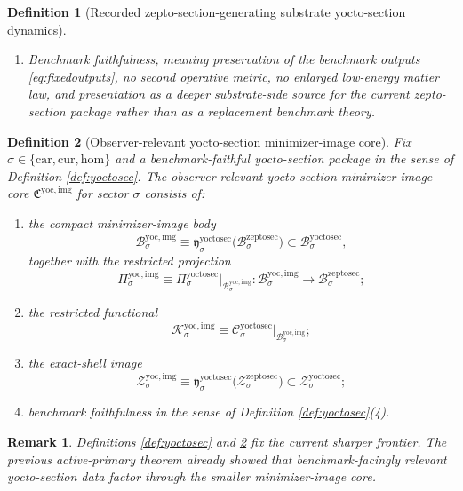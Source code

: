 \documentclass[11pt]{article}
\newcommand{\Car}{\mathrm{car}}
\newcommand{\Cur}{\mathrm{cur}}
\newcommand{\Hom}{\mathrm{hom}}
\newcommand{\ZeptoSectionBody}[1]{\mathcal B_{#1}^{\mathrm{zeptosec}}}
\newcommand{\ZeptoSectionShell}[1]{\mathcal Z_{#1}^{\mathrm{zeptosec}}}
\newcommand{\YoctoSectionBody}[1]{\mathcal B_{#1}^{\mathrm{yoctosec}}}
\newcommand{\YoctoSectionProj}[1]{\Pi_{#1}^{\mathrm{yoctosec}}}
\newcommand{\YoctoSectionFiber}[2]{\mathcal F_{#1}^{\mathrm{yoctosec}}(#2)}
\newcommand{\YoctoSectionZeptoMin}[1]{\mathfrak y_{#1}^{\mathrm{yoctosec}}}
\newcommand{\YoctoSectionFunctional}[1]{\mathscr C_{#1}^{\mathrm{yoctosec}}}
\newcommand{\YoctoSectionShell}[1]{\mathcal Z_{#1}^{\mathrm{yoctosec}}}
\newcommand{\YoctoImageCore}{\mathfrak C^{\mathrm{yoc,img}}}
\newcommand{\YoctoImgBody}[1]{\mathcal B_{#1}^{\mathrm{yoc,img}}}
\newcommand{\YoctoImgProj}[1]{\Pi_{#1}^{\mathrm{yoc,img}}}
\newcommand{\YoctoImgFunctional}[1]{\mathscr K_{#1}^{\mathrm{yoc,img}}}
\newcommand{\YoctoImgShell}[1]{\mathcal Z_{#1}^{\mathrm{yoc,img}}}
\newtheorem{definition}{Definition}
\newtheorem{remark}{Remark}
\begin{document}
\begin{definition}[Recorded zepto-section-generating substrate yocto-section dynamics]
\begin{enumerate}
\[\begin{array}{l}
    \YoctoSectionFunctional{\sigma}(y)
    =
    \displaystyle\min_{x\in\YoctoSectionFiber{\sigma}{\YoctoSectionProj{\sigma}(y)}}
    \YoctoSectionFunctional{\sigma}(x)
    \end{array}
    \right\},
    \]
    and
    \[
    \YoctoSectionProj{\sigma}\big|_{\YoctoSectionShell{\sigma}}
    :
    \YoctoSectionShell{\sigma}
    \xrightarrow{\cong}
    \ZeptoSectionShell{\sigma}
    \]
    is a diffeomorphism.
    \item Benchmark faithfulness, meaning preservation of the benchmark outputs \eqref{eq:fixedoutputs}, no second operative metric, no enlarged low-energy matter law, and presentation as a deeper substrate-side source for the current zepto-section package rather than as a replacement benchmark theory.
\end{enumerate}
\end{definition}

\begin{definition}[Observer-relevant yocto-section minimizer-image core]
\label{def:imagecore}
Fix \(\sigma\in\{\Car,\Cur,\Hom\}\) and a benchmark-faithful yocto-section package in the sense of Definition \ref{def:yoctosec}. The \emph{observer-relevant yocto-section minimizer-image core} \(\YoctoImageCore\) for sector \(\sigma\) consists of:
\begin{enumerate}
    \item the compact minimizer-image body
    \[
    \YoctoImgBody{\sigma}
    \equiv
    \YoctoSectionZeptoMin{\sigma}\bigl(\ZeptoSectionBody{\sigma}\bigr)
    \subset
    \YoctoSectionBody{\sigma},
    \]
    together with the restricted projection
    \[
    \YoctoImgProj{\sigma}
    \equiv
    \YoctoSectionProj{\sigma}\big|_{\YoctoImgBody{\sigma}}
    :
    \YoctoImgBody{\sigma}\to\ZeptoSectionBody{\sigma};
    \]
    \item the restricted functional
    \[
    \YoctoImgFunctional{\sigma}
    \equiv
    \YoctoSectionFunctional{\sigma}\big|_{\YoctoImgBody{\sigma}};
    \]
    \item the exact-shell image
    \[
    \YoctoImgShell{\sigma}
    \equiv
    \YoctoSectionZeptoMin{\sigma}\bigl(\ZeptoSectionShell{\sigma}\bigr)
    \subset
    \YoctoSectionShell{\sigma};
    \]
    \item benchmark faithfulness in the sense of Definition \ref{def:yoctosec}(4).
\end{enumerate}
\end{definition}

\begin{remark}
Definitions \ref{def:yoctosec} and \ref{def:imagecore} fix the current sharper frontier. The previous active-primary theorem already showed that benchmark-facingly relevant yocto-section data factor through the smaller minimizer-image core.
\end{remark}
\end{document}
